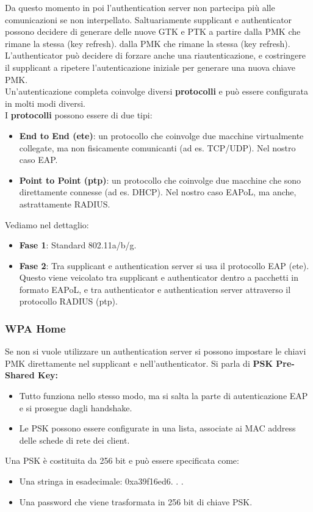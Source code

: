 \documentclass[12pt]{article}
\begin{document}
			 	Da questo momento in poi l’authentication server non partecipa più alle comunicazioni se non interpellato. Saltuariamente supplicant e authenticator possono decidere di generare delle nuove GTK e PTK a partire dalla PMK che rimane la stessa (key refresh). dalla PMK che rimane la stessa (key refresh). L’authenticator può decidere di forzare anche una riautenticazione, e costringere il supplicant a ripetere l’autenticazione iniziale per generare una nuova chiave PMK.\\
			 	Un’autenticazione completa coinvolge diversi\textbf{ protocolli} e può essere configurata in molti modi diversi.\\
			 	I \textbf{protocolli} possono essere di due tipi:
			 	\begin{itemize}
			 		\item \textbf{End to End (ete)}: un protocollo che coinvolge due macchine virtualmente collegate, ma non fisicamente
			 		comunicanti (ad es. TCP/UDP). Nel nostro caso EAP.
			 		\item \textbf{Point to Point (ptp)}: un protocollo che coinvolge due macchine che sono direttamente connesse (ad es.
			 		DHCP). Nel nostro caso EAPoL, ma anche, astrattamente RADIUS.
			 	\end{itemize}
		 		Vediamo nel dettaglio:
		 		\begin{itemize}
		 			\item \textbf{Fase 1}: Standard 802.11a/b/g.
		 			\item \textbf{Fase 2}: Tra supplicant e authentication server si usa il
		 			protocollo EAP (ete). Questo viene veicolato tra
		 			supplicant e authenticator dentro a pacchetti in
		 			formato EAPoL, e tra authenticator e
		 			authentication server attraverso il protocollo
		 			RADIUS (ptp).
		 		\end{itemize}
	 		\subsubsection{WPA Home}
	 			 Se non si vuole utilizzare un authentication server si
	 			possono impostare le chiavi PMK direttamente nel supplicant e nell’authenticator. Si parla di \textbf{PSK Pre-Shared Key:}
	 			\begin{itemize}
	 				\item Tutto funziona nello stesso modo, ma si salta la parte di autenticazione EAP e si prosegue dagli handshake.
	 				\item Le PSK possono essere configurate in una lista, associate
	 				ai MAC address delle schede di rete dei client.
	 			\end{itemize}
	 			Una PSK è costituita da 256 bit e può essere specificata come:
	 			\begin{itemize}
	 				\item Una stringa in esadecimale: 0xa39f16ed6. . .
	 				\item Una password che viene trasformata in 256 bit di chiave
	 				PSK.
	 			\end{itemize}
	 			
\end{document}
